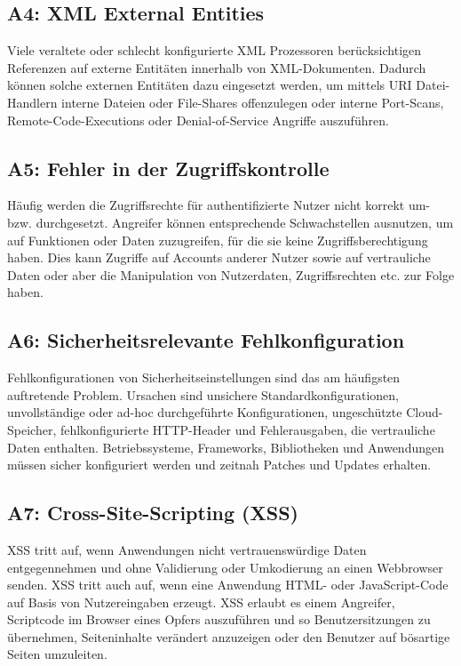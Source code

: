 \documentclass[12pt,oneside,a4paper,parskip]{scrbook}
\begin{document}
\subsection{A4: XML External Entities}
Viele veraltete oder schlecht konfigurierte XML Prozessoren berücksichtigen Referenzen auf
externe Entitäten innerhalb von XML-Dokumenten. Dadurch können solche externen Entitäten
dazu eingesetzt werden, um mittels URI Datei-Handlern interne Dateien oder File-Shares offenzulegen
oder interne Port-Scans, Remote-Code-Executions oder Denial-of-Service Angriffe
auszuführen.

\subsection{A5: Fehler in der Zugriffskontrolle}
Häufig werden die Zugriffsrechte für authentifizierte Nutzer nicht korrekt um- bzw. durchgesetzt.
Angreifer können entsprechende Schwachstellen ausnutzen, um auf Funktionen oder Daten
zuzugreifen, für die sie keine Zugriffsberechtigung haben. Dies kann Zugriffe auf Accounts
anderer Nutzer sowie auf vertrauliche Daten oder aber die Manipulation von Nutzerdaten,
Zugriffsrechten etc. zur Folge haben.

\subsection{A6: Sicherheitsrelevante Fehlkonfiguration}
Fehlkonfigurationen von Sicherheitseinstellungen sind das am häufigsten auftretende Problem.
Ursachen sind unsichere Standardkonfigurationen, unvollständige oder ad-hoc durchgeführte
Konfigurationen, ungeschützte Cloud-Speicher, fehlkonfigurierte HTTP-Header und Fehlerausgaben,
die vertrauliche Daten enthalten. Betriebssysteme, Frameworks, Bibliotheken und Anwendungen
müssen sicher konfiguriert werden und zeitnah Patches und Updates erhalten.

\subsection{A7: Cross-Site-Scripting (XSS)}
XSS tritt auf, wenn Anwendungen nicht vertrauenswürdige Daten entgegennehmen und ohne
Validierung oder Umkodierung an einen Webbrowser senden. XSS tritt auch auf, wenn eine
Anwendung HTML- oder JavaScript-Code auf Basis von Nutzereingaben erzeugt. XSS erlaubt es
einem Angreifer, Scriptcode im Browser eines Opfers auszuführen und so Benutzersitzungen zu
übernehmen, Seiteninhalte verändert anzuzeigen oder den Benutzer auf bösartige Seiten
umzuleiten.
\end{document}
